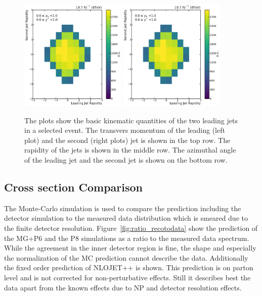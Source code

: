 \begin{figure}[htbp]
    \includegraphics[width=0.45\textwidth]{figures/measurement/jet12_rapidity_yb0ys0.pdf}\hfill
    \includegraphics[width=0.45\textwidth]{figures/measurement/jet12_rapidity_yb0ys0.pdf}
    \caption{The plots show the basic kinematic quantities of the two leading jets in a selected event.
             The transvers momentum of the leading (left plot) and the second (right plots) jet is shown
         in the top row. The rapidity of the jets is shown in the middle row. The azimuthal angle of the
     leading jet and the second jet is shown on the bottom row.}
    \label{fig:controlplots:rapidity}
\end{figure}


\subsection{Cross section Comparison}

The Monte-Carlo simulation is used to compare the prediction including the detector simulation
to the measured data distribution which is smeared due to the finite detector resolution. Figure~\ref{fig:ratio_recotodata}
show the prediction of the MG+P6 and the P8 simulations as a ratio to the measured data spectrum.
While the agreement in the inner detector region is fine, the shape and especially the normalization
of the MC prediction cannot describe the data. Additionally the fixed order prediction of NLOJET++
is shown. This prediction is on parton level and is not corrected for non-perturbative effects. Still
it describes best the data apart from the known effects due to NP and detector resolution effects.


